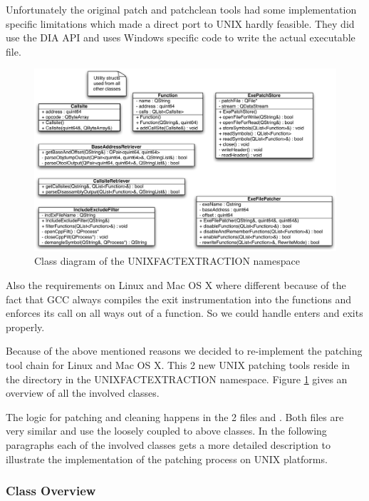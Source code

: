 Unfortunately the original patch and patchclean tools had some implementation specific limitations which made a direct port to UNIX hardly feasible.  They did use the DIA API and  uses Windows specific code to write the actual executable file.

\begin{figure}[ht]
\centering
\includegraphics[width=16cm]{images/unixpatchtools}
\caption{Class diagram of the UNIXFACTEXTRACTION namespace} \label{fig:unixfe_unixfe}
\end{figure}

Also the requirements on Linux and Mac OS X where different because of the fact that GCC always compiles the exit instrumentation into the functions and enforces its call on all ways out of a function.  So we could handle enters and exits properly.

Because of the above mentioned reasons we decided to re-implement the patching tool chain for Linux and Mac OS X.  This 2 new UNIX patching tools reside in the  directory in the UNIXFACTEXTRACTION namespace.  Figure \ref{fig:unixfe_unixfe} gives an overview of all the involved classes.

The logic for patching and cleaning happens in the 2 files  and .  Both files are very similar and use the loosely coupled to above classes.  In the following paragraphs each of the involved classes gets a more detailed description to illustrate the implementation of the patching process on UNIX platforms.

\subsubsection{Class Overview}

